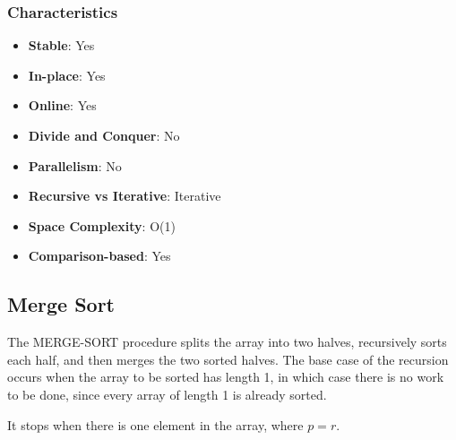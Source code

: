 \subsubsection*{Characteristics}

\begin{multicols}{2}
\begin{itemize}
    \item \textbf{Stable}: Yes
    \item \textbf{In-place}: Yes
    \item \textbf{Online}: Yes
    \item \textbf{Divide and Conquer}: No
    \item \textbf{Parallelism}: No
    \item \textbf{Recursive vs Iterative}: Iterative
    \item \textbf{Space Complexity}: O(1)
    \item \textbf{Comparison-based}: Yes
\end{itemize}
\end{multicols}

\newpage

\subsection{Merge Sort}


The MERGE-SORT procedure splits the array into two halves, recursively sorts each half, and then merges the two sorted halves. The base case of the recursion occurs when the array to be sorted has length 1, in which case there is no work to be done, since every array of length 1 is already sorted. 

\begin{observationblock}
    It stops when there is one element in the array, where $p=r$.
\end{observationblock}

